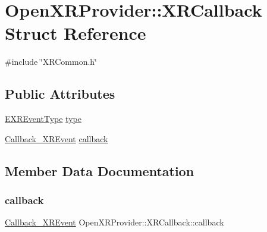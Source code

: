 \hypertarget{struct_open_x_r_provider_1_1_x_r_callback}{}\section{Open\+X\+R\+Provider\+::X\+R\+Callback Struct Reference}
\label{struct_open_x_r_provider_1_1_x_r_callback}


{\ttfamily \#include \char`\"{}X\+R\+Common.\+h\char`\"{}}

\subsection*{Public Attributes}
\begin{DoxyCompactItemize}
\item 
\mbox{\hyperlink{namespace_open_x_r_provider_aa80d286c249d35071f2ff4d19d9dc4c3}{E\+X\+R\+Event\+Type}} \mbox{\hyperlink{struct_open_x_r_provider_1_1_x_r_callback_a2bc73be6cd45ed494ca09aea8c75d399}{type}}
\item 
\mbox{\hyperlink{namespace_open_x_r_provider_a658d364c78f8aa6deb33009e9c4ac0b8}{Callback\+\_\+\+X\+R\+Event}} \mbox{\hyperlink{struct_open_x_r_provider_1_1_x_r_callback_abf3c3676fca347f666e8c97906bec53d}{callback}}
\end{DoxyCompactItemize}


\subsection{Member Data Documentation}
\mbox{\label{struct_open_x_r_provider_1_1_x_r_callback_abf3c3676fca347f666e8c97906bec53d}} 
\subsubsection{\texorpdfstring{callback}{callback}}
{\footnotesize\ttfamily \mbox{\hyperlink{namespace_open_x_r_provider_a658d364c78f8aa6deb33009e9c4ac0b8}{Callback\+\_\+\+X\+R\+Event}} Open\+X\+R\+Provider\+::\+X\+R\+Callback\+::callback}

\mbox{\label{struct_open_x_r_provider_1_1_x_r_callback_a2bc73be6cd45ed494ca09aea8c75d399}} 
